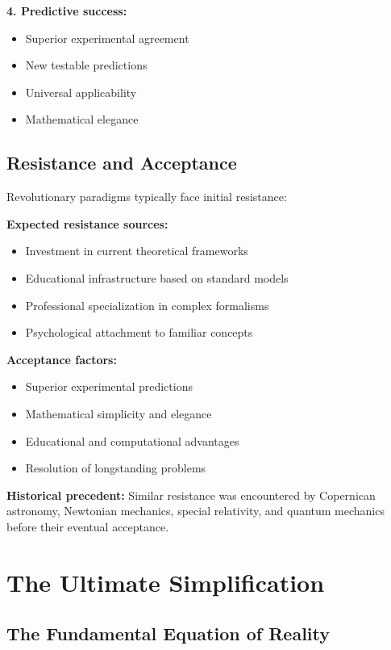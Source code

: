 \documentclass[12pt,a4paper]{report}
\begin{document}
\textbf{4. Predictive success:}
\begin{itemize}
	\item Superior experimental agreement
	\item New testable predictions
	\item Universal applicability
	\item Mathematical elegance
\end{itemize}

\subsection{Resistance and Acceptance}
\label{subsec:resistance_acceptance}

Revolutionary paradigms typically face initial resistance:

\textbf{Expected resistance sources:}
\begin{itemize}
	\item Investment in current theoretical frameworks
	\item Educational infrastructure based on standard models
	\item Professional specialization in complex formalisms
	\item Psychological attachment to familiar concepts
\end{itemize}

\textbf{Acceptance factors:}
\begin{itemize}
	\item Superior experimental predictions
	\item Mathematical simplicity and elegance
	\item Educational and computational advantages
	\item Resolution of longstanding problems
\end{itemize}

\textbf{Historical precedent:}
Similar resistance was encountered by Copernican astronomy, Newtonian mechanics, special relativity, and quantum mechanics before their eventual acceptance.

\section{The Ultimate Simplification}
\label{sec:ultimate_simplification}

\subsection{The Fundamental Equation of Reality}
\label{subsec:fundamental_equation}
\end{document}
